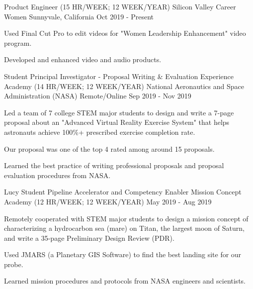 

\begin{cventries}

  \cventry
    {Product Engineer (15 HR/WEEK; 12 WEEK/YEAR)} %
    {Silicon Valley Career Women} %
    {Sunnyvale, California} %
    {Oct 2019 - Present} %
    {
	\begin{cvitems} %
      	\item Used Final Cut Pro to edit videos for "Women Leadership Enhancement" video program.
      	\item Developed and enhanced video and audio products.
	\end{cvitems}
    }
    
  \cventry
    {Student Principal Investigator - Proposal Writing \& Evaluation Experience Academy (14 HR/WEEK; 12 WEEK/YEAR)} %
    {National Aeronautics and Space Administration (NASA)} %
    {Remote/Online} %
    {Sep 2019 - Nov 2019} %
    {
	\begin{cvitems} %
      	\item Led a team of 7 college STEM major students to design and write a 7-page proposal about an "Advanced Virtual Reality Exercise System" that helps astronauts achieve 100\%+ prescribed exercise completion rate. 
      	\item Our proposal was one of the top 4 rated among around 15 proposals.
      	\item Learned the best practice of writing professional proposals and proposal evaluation procedures from NASA.
	\end{cvitems}
    }
   
   \cventry
    {Lucy Student Pipeline Accelerator and Competency Enabler Mission Concept Academy (12 HR/WEEK; 12 WEEK/YEAR)} %
    {} %
    {} %
    {May 2019 - Aug 2019} %
    {
	\begin{cvitems} %
      	\item Remotely cooperated with STEM major students to design a mission concept of characterizing a hydrocarbon sea (mare) on Titan, the largest moon of Saturn, and write a 35-page Preliminary Design Review (PDR). 
      	\item Used JMARS (a Planetary GIS Software) to find the best landing site for our probe.
      	\item Learned mission procedures and protocols from NASA engineers and scientists.
	\end{cvitems}
    }
    

\end{cventries}
